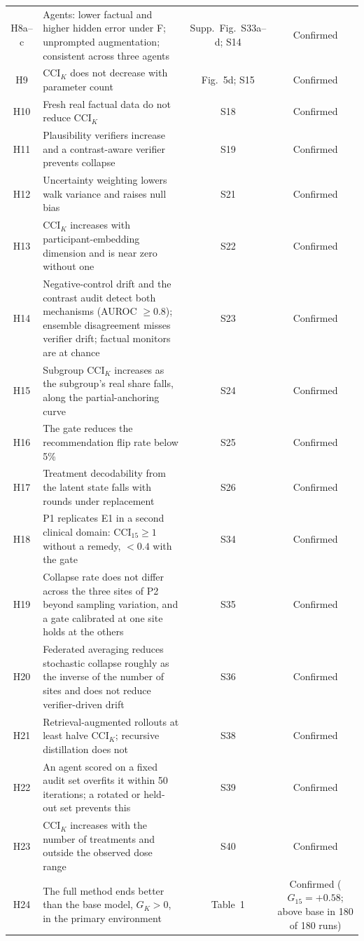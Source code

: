 \documentclass[11pt,a4paper]{article}
\newcommand{\CCI}{\mathrm{CCI}}
\begin{document}
\begin{table}[!htbp]
\begin{tabularx}{\textwidth}{@{}c Y c c@{}}
H8a--c & Agents: lower factual and higher hidden error under F; unprompted augmentation; consistent across three agents & Supp.\ Fig.~S33a--d; S14 & Confirmed\\
H9 & $\CCI_K$ does not decrease with parameter count & Fig.~5d; S15 & Confirmed\\
H10 & Fresh real factual data do not reduce $\CCI_K$ & S18 & Confirmed\\
H11 & Plausibility verifiers increase and a contrast-aware verifier prevents collapse & S19 & Confirmed\\
H12 & Uncertainty weighting lowers walk variance and raises null bias & S21 & Confirmed\\
H13 & $\CCI_K$ increases with participant-embedding dimension and is near zero without one & S22 & Confirmed\\
H14 & Negative-control drift and the contrast audit detect both mechanisms (AUROC $\ge0.8$); ensemble disagreement misses verifier drift; factual monitors are at chance & S23 & Confirmed\\
H15 & Subgroup $\CCI_K$ increases as the subgroup's real share falls, along the partial-anchoring curve & S24 & Confirmed\\
H16 & The gate reduces the recommendation flip rate below 5\% & S25 & Confirmed\\
H17 & Treatment decodability from the latent state falls with rounds under replacement & S26 & Confirmed\\
H18 & P1 replicates E1 in a second clinical domain: $\CCI_{15}\ge1$ without a remedy, $<0.4$ with the gate & S34 & Confirmed\\
H19 & Collapse rate does not differ across the three sites of P2 beyond sampling variation, and a gate calibrated at one site holds at the others & S35 & Confirmed\\
H20 & Federated averaging reduces stochastic collapse roughly as the inverse of the number of sites and does not reduce verifier-driven drift & S36 & Confirmed\\
H21 & Retrieval-augmented rollouts at least halve $\CCI_K$; recursive distillation does not & S38 & Confirmed\\
H22 & An agent scored on a fixed audit set overfits it within 50 iterations; a rotated or held-out set prevents this & S39 & Confirmed\\
H23 & $\CCI_K$ increases with the number of treatments and outside the observed dose range & S40 & Confirmed\\
H24 & The full method ends better than the base model, $G_K>0$, in the primary environment & Table~1 & Confirmed ($G_{15}=+0.58$; above base in 180 of 180 runs)\\

\end{tabularx}
\end{table}
\end{document}
